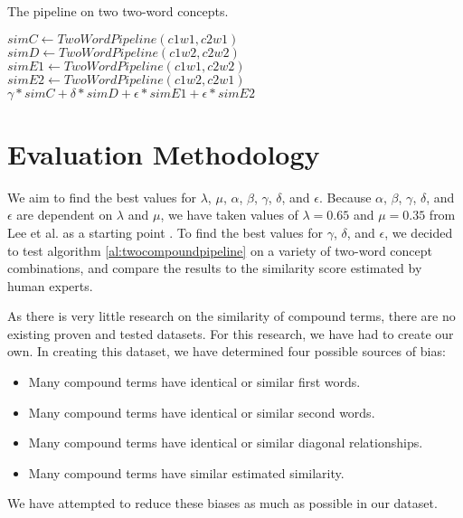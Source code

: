 \documentclass{article}
\begin{document}
\begin{algorithm}
\caption{The pipeline on two two-word concepts.}\label{al:twocompoundpipeline}
\begin{algorithmic}[1]
		\State $\textit{simC} \gets \textit{TwoWordPipeline}(c1w1, c2w1)$
		\State $\textit{simD} \gets \textit{TwoWordPipeline}(c1w2, c2w2)$
		\State $\textit{simE1} \gets \textit{TwoWordPipeline}(c1w1, c2w2)$
		\State $\textit{simE2} \gets \textit{TwoWordPipeline}(c1w2, c2w1)$
		\State \Return $\gamma * \textit{simC} + \delta * \textit{simD} + \epsilon * \textit{simE1} + \epsilon * \textit{simE2}$
	\EndProcedure
\end{algorithmic}
\end{algorithm}

\section{Evaluation Methodology} \label{sec:evalmeth}

We aim to find the best values for $\lambda$, $\mu$, $\alpha$, $\beta$, $\gamma$, $\delta$, and $\epsilon$. Because $\alpha$, $\beta$, $\gamma$, $\delta$, and $\epsilon$ are dependent on $\lambda$ and $\mu$, we have taken values of $\lambda = 0.65$ and $\mu = 0.35$ from Lee et al. as a starting point \cite{lee2016combining}. To find the best values for $\gamma$, $\delta$, and $\epsilon$, we decided to test algorithm \ref{al:twocompoundpipeline} on a variety of two-word concept combinations, and compare the results to the similarity score estimated by human experts.

As there is very little research on the similarity of compound terms, there are no existing proven and tested datasets. For this research, we have had to create our own. In creating this dataset, we have determined four possible sources of bias:
\begin{itemize}
	\item Many compound terms have identical or similar first words.
	\item Many compound terms have identical or similar second words.
	\item Many compound terms have identical or similar diagonal relationships.
	\item Many compound terms have similar estimated similarity.
\end{itemize}
We have attempted to reduce these biases as much as possible in our dataset.
\end{document}
